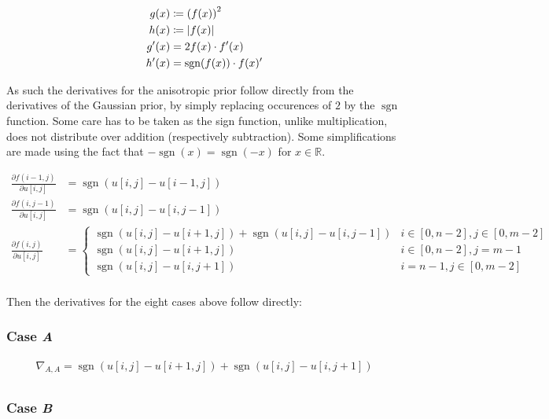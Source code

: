 \documentclass[a4paper]{scrreprt}
\DeclarePairedDelimiter\abs{\lvert}{\rvert}
\DeclareMathOperator{\sgn}{sgn}
\begin{document}
\begin{align*}
		g(x) & \coloneqq \left(f(x)\right)^2 \\
		h(x) & \coloneqq \abs*{f(x)} \\
		g'(x) & = 2 f(x) \cdot f'(x) \\
		h'(x) & = \sgn(f(x)) \cdot f(x)'
\end{align*}

As such the derivatives for the anisotropic prior follow directly from the
derivatives of the Gaussian prior, by simply replacing occurences of $2$ by the
$\sgn$ function. Some care has to be taken as the sign function, unlike
multiplication, does not distribute over addition (respectively subtraction).
Some simplifications are made using the fact that $-\sgn(x) = \sgn(-x)$ for $x
\in \mathbb{R}$.

\begin{align*}
		\frac{\partial f(i - 1, j)}{\partial u[i, j]} & =
		  \sgn(u[i, j] - u[i - 1, j]) \\
		\frac{\partial f(i, j - 1)}{\partial u[i, j]} & =
		  \sgn(u[i, j] - u[i, j - 1]) \\
		\frac{\partial f(i, j)}{\partial u[i, j]} & =
		  \begin{cases}
				  \sgn(u[i, j] - u[i + 1, j]) + \sgn(u[i, j] - u[i, j - 1])
				    & i \in [0, n - 2], j \in [0, m - 2] \\
				  \sgn(u[i, j] - u[i + 1, j])
				    & i \in [0, n - 2], j = m - 1 \\
				  \sgn(u[i, j] - u[i, j + 1])
					& i = n - 1, j \in [0, m - 2]
		  \end{cases} \\
\end{align*}

Then the derivatives for the eight cases above follow directly:

\subsubsection{Case \emph{A}}

\begin{align*}
		\nabla_{A, A} = 
		  \sgn(u[i, j] - u[i + 1, j]) + \sgn(u[i, j] - u[i, j + 1]) \\
\end{align*}

\subsubsection{Case \emph{B}}
\end{document}
